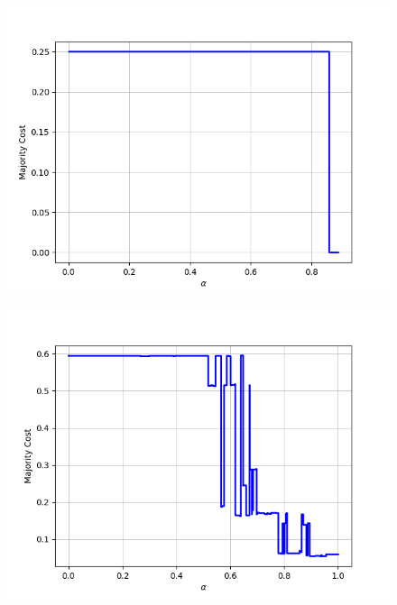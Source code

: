 \begin{figure}[h]
\begin{minipage}{.24\textwidth}
  {\includegraphics[width=\linewidth]{plots/nell-sc/politicsgroup}}
\end{minipage}
\begin{minipage}{.24\textwidth}
  \centering
  {\includegraphics[width=\linewidth]{plots/nell-sc/Product}}
\end{minipage}
\begin{minipage}{.24\textwidth}
  \centering

\end{minipage}
\end{figure}
